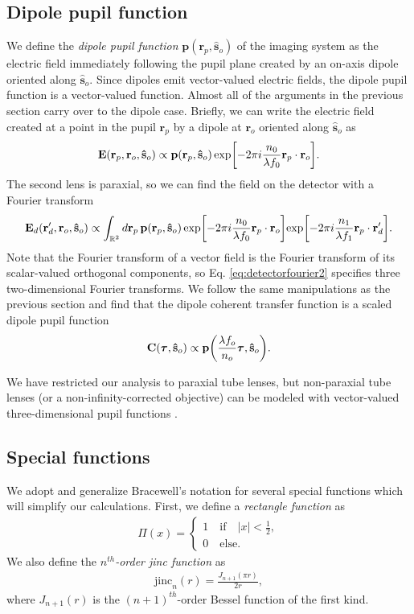 \documentclass[]{osa-article}
\let\originalleft\left
\let\originalright\right
\renewcommand{\left}{\mathopen{}\mathclose\bgroup\originalleft}
\renewcommand{\right}{\aftergroup\egroup\originalright}
\providecommand{\mb}[1]{\mathbf{#1}}
\providecommand{\ro}{\mathbf{\mathbf{r}}_o}
\providecommand{\so}{\mathbf{\hat{s}}_o}
\providecommand{\rp}{\mathbf{r}_p}
\providecommand{\rd}{\mathbf{r}_d}
\providecommand{\mbb}[1]{\mathbb{#1}}
\providecommand{\bs}[1]{\boldsymbol{#1}}
\providecommand{\taup}{\bs{\tau}}
\begin{document}
\subsection{Dipole pupil function}
We define the \textit{dipole pupil function} $\mb{p}(\rp, \so)$ of the imaging
system as the electric field immediately following the pupil plane created by
an on-axis dipole oriented along $\so$. Since dipoles emit vector-valued
electric fields, the dipole pupil function is a vector-valued function. Almost
all of the arguments in the previous section carry over to the dipole case.
Briefly, we can write the electric field created at a point in the pupil
$\rp$ by a dipole at $\ro$ oriented along $\so$ as
 \begin{align}
   \mb{E}(\rp, \ro, \so) \propto \mb{p}(\rp, \so)\,\text{exp}\left[-2\pi i \frac{n_0}{\lambda f_0} \rp\cdot\ro \right]. \label{eq:pupil2}
 \end{align}
 The second lens is paraxial, so we can find the field on the detector with a
 Fourier transform
 \begin{align}
   \mb{E}_d(\rd', \ro, \so) \propto \int_{\mbb{R}^2}d\rp\, \mb{p}(\rp, \so)\,\text{exp}\left[-2\pi i \frac{n_0}{\lambda f_0} \rp\cdot\ro \right]\text{exp}\left[-2\pi i \frac{n_1}{\lambda f_1} \rp\cdot\rd' \right]. \label{eq:detectorfourier2}
\end{align}
Note that the Fourier transform of a vector field is the Fourier transform of
its scalar-valued orthogonal components, so Eq. \eqref{eq:detectorfourier2}
specifies three two-dimensional Fourier transforms. We follow the same
manipulations as the previous section and find that the dipole coherent transfer
function is a scaled dipole pupil function
\begin{align}
  \mb{C}(\taup, \so) \propto \mb{p}\left(\frac{\lambda f_o}{n_o}\taup, \so\right). \label{eq:monopupildip}
\end{align}

We have restricted our analysis to paraxial tube lenses, but non-paraxial tube
lenses (or a non-infinity-corrected objective) can be modeled with vector-valued
three-dimensional pupil functions \cite{sheppard1994, gu2000, arnison2002,
  foreman2011-2}.

\subsection{Special functions}
We adopt and generalize Bracewell's notation \cite{bracewell2004} for several
special functions which will simplify our calculations. First, we define a
\textit{rectangle function} as
\begin{align}
  \Pi(x) = 
  \begin{cases}
    1\quad \text{if}\quad |x| < \frac{1}{2},\\
    0\quad \text{else}.
  \end{cases}
\end{align}
We also define the \textit{$n^{th}$-order jinc function} as
\begin{align}
  \text{jinc}_n(r) = \frac{J_{n+1}(\pi r)}{2r},
\end{align}
where $J_{n+1}(r)$ is the $(n+1)^{th}$-order Bessel function of the first kind.
\end{document}
